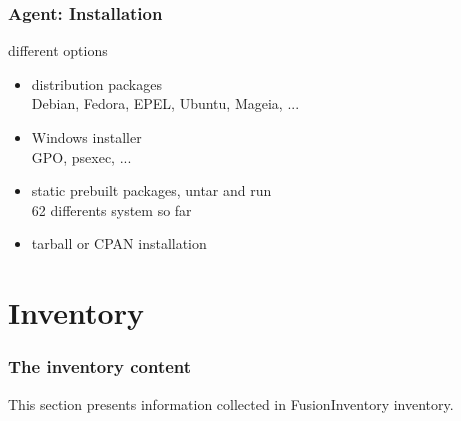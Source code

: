 \documentclass{beamer}
\begin{document}
\begin{frame}
    \frametitle{Agent: Installation}


    \begin{block}{different options}
        \begin{itemize}
            \item distribution packages \\
            \small{Debian, Fedora, EPEL, Ubuntu, Mageia, ...}
            \item Windows installer \\
            \small{GPO, psexec, ...}
            \item static prebuilt packages, untar and run \\
            \small{62 differents system so far}
            \item tarball or CPAN installation
        \end{itemize}
    \end{block}
\end{frame}




\section{Inventory}

\begin{frame}

    \frametitle{The inventory content}

This section presents information collected in FusionInventory inventory.



\end{frame}
\end{document}
